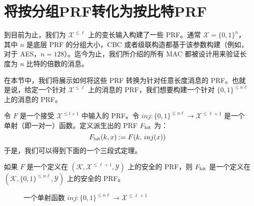 \section{将按分组PRF转化为按比特PRF}\label{sec:6-8}

到目前为止，我们为 $\mathcal{X}^{\leq\ell}$ 上的变长输入构建了一些 PRF。通常 $\mathcal{X}=\{0,1\}^n$，其中 $n$ 是底层 PRF 的分组大小，CBC 或者级联构造都基于该参数构建（例如，对于 AES，$n=128$）。迄今为止，我们所介绍的所有 MAC 都被设计用来验证长度为 $n$ 比特的倍数的消息。

在本节中，我们将展示如何将这些 PRF 转换为针对任意长度消息的 PRF。也就是说，给定一个针对 $\mathcal{X}^{\leq\ell}$ 上的消息的 PRF，我们想要构建一个针对 $\{0,1\}^{\leq n\ell}$ 上的消息的 PRF。

令 $F$ 是一个接受 $\mathcal{X}^{\leq l+1}$ 中输入的 PRF。令 $inj:\{0,1\}^{\leq n\ell}\to\mathcal{X}^{\leq\ell+1}$ 是一个单射（即一对一）函数。定义派生出的 PRF $F_{\rm bit}$ 为：
\[
F_{\rm bit}(k,x):=F(k,\,inj(x))
\]
于是，我们可以得到下面的一个三段式定理。

\begin{theorem}\label{theo:6-10}
如果 $F$ 是一个定义在 $(\mathcal{K},\mathcal{X}^{\leq\ell+1},\mathcal{Y})$ 上的安全的 PRF，则 $F_{\rm bit}$ 是一个定义在 $(\mathcal{K},\{0,1\}^{\leq n\ell},\mathcal{Y})$ 上的安全的 PRF。
\end{theorem}

\begin{figure}
  \centering
  
  \caption{一个单射函数 $inj:\{0,1\}^{\leq n\ell}\to\mathcal{X}^{\leq\ell+1}$}
  \label{fig:6-7}
\end{figure}

